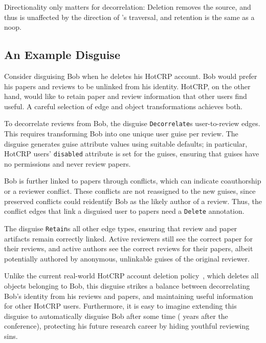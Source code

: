     Directionality only matters for decorrelation: Deletion removes the source, and thus is unaffected by
    the direction of \sys's traversal, and retention is the same as a noop.

\subsection{An Example Disguise}
\label{design:eg}
%
Consider disguising Bob when he deletes his HotCRP account.
%
Bob would prefer his papers and reviews to be unlinked from his identity.
%
HotCRP, on the other hand, would like to retain paper and review information that other users
find useful.
%
A careful selection of edge and object transformations achieves both.
%

%
To decorrelate reviews from Bob, the disguise \texttt{Decorrelate}s user-to-review edges.
%
This requires transforming Bob into one unique user guise per review.
%
The disguise generates guise attribute values using suitable defaults;
%
in particular, HotCRP users' \texttt{disabled} attribute is set for the guises,
ensuring that guises have no permissions and never review papers.
%

%
Bob is further linked to papers through conflicts, which can indicate coauthorship or a
reviewer conflict.
%
These conflicts are not reassigned to the new guises, since preserved
conflicts could reidentify Bob as the likely author of a review. Thus, the
conflict edges that link a disguised user to papers need a \texttt{Delete} annotation.
%

The disguise \texttt{Retain}s all other edge types, ensuring that review and paper
artifacts remain correctly linked. Active reviewers still see the correct paper for their reviews,
and active authors see the correct reviews for their papers, albeit potentially authored by
anonymous, unlinkable guises of the original reviewer.
%
%

%
Unlike the current real-world HotCRP account deletion policy~\cite{hotcrp:privacy}, which
deletes all objects belonging to Bob, this disguise strikes a balance between decorrelating
Bob's identity from his reviews and papers, and maintaining useful information for other
HotCRP users.
%
Furthermore, it is easy to imagine extending this disguise to automatically disguise Bob
after some time ( years after the conference), protecting his future research career
by hiding youthful reviewing sins.
